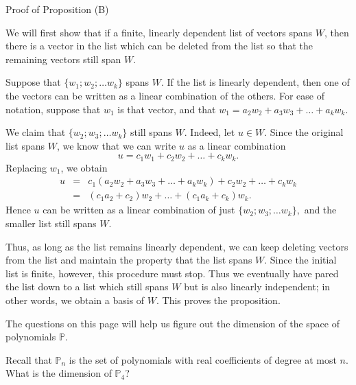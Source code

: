 \begin{edXshowhide}{Proof of Proposition (B)}

We will first show that if a finite, linearly dependent list of vectors spans $W$, then
there is a vector in the list which can be deleted from the list so that the 
remaining vectors still span $W$.  

Suppose that $\{w_1; w_2; \ldots w_k\}$ spans $W$.  If the list is linearly dependent, then one of the
vectors can be written as a linear combination of the others.  For ease of notation, suppose that $w_1$
is that vector, and that $w_1 = a_2w_2 + a_3w_3 +\ldots + a_kw_k$.  

We claim that $\{w_2; w_3; \ldots w_k\}$ still spans $W$.  Indeed, let $u \in W$.  Since the original
list spans $W$, we know that we can write $u$ as a linear combination
\[u = c_1w_1 + c_2w_2 + \ldots + c_kw_k.\]
Replacing $w_1$, we obtain
\[
\begin{array}{rcl} u & = & c_1(a_2w_2 + a_3w_3 +\ldots + a_kw_k) + c_2w_2 + \ldots + c_kw_k  \\
& = & (c_1a_2+c_2)w_2 + \ldots + (c_1a_k + c_k)w_k. 
\end{array}
\]
Hence $u$ can be written as a linear combination of just $\{w_2; w_3; \ldots w_k\},$
and the smaller list still spans $W$.  

Thus, as long as the list remains linearly dependent, we can keep deleting vectors from the list
and maintain the property that the list spans $W$.  Since the initial list is finite, however,
this procedure must stop.  Thus we eventually have pared the list down to a list which still spans
$W$ but is also linearly independent; in other words, we obtain a basis of $W$.  This proves the
proposition.

\end{edXshowhide}



\endedxtext

\endedxvertical





The questions on this page will help us figure out the dimension of the space of polynomials $\mathbb{P}$.  

Recall that $\mathbb{P}_n$ is the set of polynomials with real coefficients of degree at most $n$.  
What is the dimension of $\mathbb{P}_4$?  


